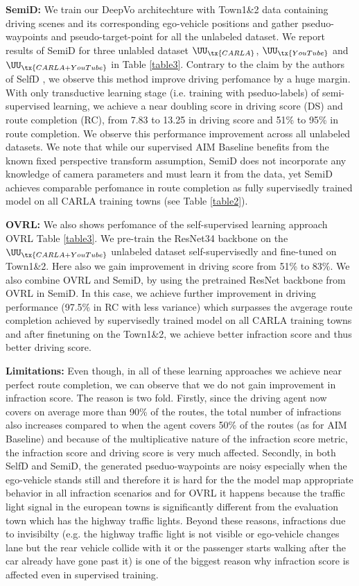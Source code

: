 \documentclass[letterpaper, 12pt]{book}
\theoremstyle{definition}
\theoremstyle{definition}
\theoremstyle{definition}
\theoremstyle{definition}
\theoremstyle{definition}
\begin{document}
\textbf{SemiD:} We train our DeepVo architechture with Town1\&2 data containing driving
scenes and its corresponding ego-vehicle positions and gather pseduo-waypoints
and pseudo-target-point for all the unlabeled dataset. We report results of
SemiD for three unlabled dataset \(\UU_{\tx{CARLA}}\), \(\UU_{\tx{YouTube}}\)
and \(\UU_{\tx{CARLA + YouTube}}\) in Table \ref{table3}. Contrary to the claim
by the authors of SelfD \cite{Zhang2022a}, we observe this method improve
driving perfomance by a huge margin. With only transductive learning stage
(i.e. training with pseduo-labels) of semi-supervised learning, we achieve a
near doubling score in driving score (DS) and route completion (RC), from 7.83
to 13.25 in driving score and 51\% to 95\% in route completion. We observe this
performance improvement across all unlabeled datasets. We note that while our
supervised AIM Baseline benefits from the known fixed perspective transform
assumption, SemiD does not incorporate any knowledge of camera parameters and
must learn it from the data, yet SemiD achieves comparable perfomance in route
completion as fully supervisedly trained model on all CARLA training towns (see
Table \ref{table2}).

\textbf{OVRL:} We also shows perfomance of the self-supervised learning approach OVRL
Table \ref{table3}. We pre-train the ResNet34 backbone on the \(\UU_{\tx{CARLA +
YouTube}}\) unlabeled dataset self-supervisedly and fine-tuned on Town1\&2. Here
also we gain improvement in driving score from 51\% to 83\%. We also combine OVRL
and SemiD, by using the pretrained ResNet backbone from OVRL in SemiD. In this
case, we achieve further improvement in driving performance (97.5\% in RC with
less variance) which surpasses the avgerage route completion achieved by
supervisedly trained model on all CARLA training towns and after finetuning on
the Town1\&2, we achieve better infraction score and thus better driving score.

\textbf{Limitations:} Even though, in all of these learning approaches we achieve near
perfect route completion, we can observe that we do not gain improvement in
infraction score. The reason is two fold. Firstly, since the driving agent now
covers on average more than 90\% of the routes, the total number of infractions
also increases compared to when the agent covers 50\% of the routes (as for AIM
Baseline) and because of the multiplicative nature of the infraction score
metric, the infraction score and driving score is very much affected. Secondly,
in both SelfD and SemiD, the generated pseduo-waypoints are noisy especially
when the ego-vehicle stands still and therefore it is hard for the the model map
appropriate behavior in all infraction scenarios and for OVRL it happens because
the traffic light signal in the european towns is significantly different from
the evaluation town which has the highway traffic lights. Beyond these reasons,
infractions due to invisibilty (e.g. the highway traffic light is not visible or
ego-vehicle changes lane but the rear vehicle collide with it or the passenger
starts walking after the car already have gone past it) is one of the biggest
reason why infraction score is affected even in supervised training.
\end{document}
